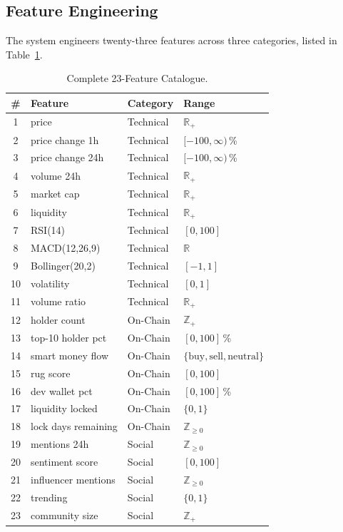 \documentclass[12pt,a4paper,oneside,openany]{book}
\begin{document}
\subsection{Feature Engineering}
The system engineers twenty-three features across three categories, listed in Table~\ref{tab:feat}.

\begin{table}[H]
\centering
\caption{Complete 23-Feature Catalogue.}
\label{tab:feat}
\small
\begin{tabular}{@{}clll@{}}
\toprule
\textbf{\#} & \textbf{Feature} & \textbf{Category} & \textbf{Range} \\
\midrule
1  & price                      & Technical & $\mathbb{R}_+$ \\
2  & price change 1h            & Technical & $[-100, \infty)$\,\% \\
3  & price change 24h           & Technical & $[-100, \infty)$\,\% \\
4  & volume 24h                 & Technical & $\mathbb{R}_+$ \\
5  & market cap                 & Technical & $\mathbb{R}_+$ \\
6  & liquidity                  & Technical & $\mathbb{R}_+$ \\
7  & RSI(14)                    & Technical & $[0, 100]$ \\
8  & MACD(12,26,9)              & Technical & $\mathbb{R}$ \\
9  & Bollinger(20,2)            & Technical & $[-1, 1]$ \\
10 & volatility                 & Technical & $[0, 1]$ \\
11 & volume ratio               & Technical & $\mathbb{R}_+$ \\
12 & holder count               & On-Chain  & $\mathbb{Z}_+$ \\
13 & top-10 holder pct          & On-Chain  & $[0, 100]$\,\% \\
14 & smart money flow           & On-Chain  & $\{\mathrm{buy}, \mathrm{sell}, \mathrm{neutral}\}$ \\
15 & rug score                  & On-Chain  & $[0, 100]$ \\
16 & dev wallet pct             & On-Chain  & $[0, 100]$\,\% \\
17 & liquidity locked           & On-Chain  & $\{0, 1\}$ \\
18 & lock days remaining        & On-Chain  & $\mathbb{Z}_{\geq 0}$ \\
19 & mentions 24h               & Social    & $\mathbb{Z}_{\geq 0}$ \\
20 & sentiment score            & Social    & $[0, 100]$ \\
21 & influencer mentions        & Social    & $\mathbb{Z}_{\geq 0}$ \\
22 & trending                   & Social    & $\{0, 1\}$ \\
23 & community size             & Social    & $\mathbb{Z}_+$ \\
\bottomrule
\end{tabular}
\end{table}
\end{document}
